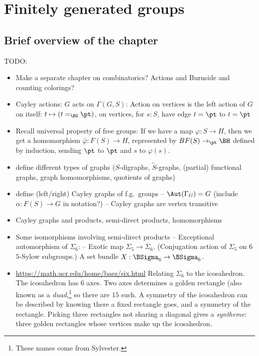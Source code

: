 \chapter{Finitely generated groups}
\label{ch:fggroups}

\section{Brief overview of the chapter}
\label{sec:fggroups-overview}

TODO:
\begin{itemize}
\item Make a separate chapter on combinatorics? Actions and Burnside and counting colorings?
\item Cayley actions: $G$ acts on $\Gamma(G,S)$: Action on vertices is the left action of $G$ on itself: $t \mapsto (t=_{\BG} \pt)$, on vertices, for $s : S$, have edge $t = \pt$ to $t = \pt$
\item Recall universal property of free groups: If we have a map $\varphi : S \to H$, then we get a homomorphism $\bar\varphi : F(S) \to H$, represented by $BF(S) \to_\pt \BH$ defined by induction, sending $\pt$ to $\pt$ and $s$ to $\varphi(s)$.
\item define different types of graphs ($S$-digraphs, $\tilde S$-graphs,
  (partial) functional graphs, graph homomorphisms, quotients of graphs)
\item define (left/right) Cayley graphs of f.g.~groups
  -- $\Aut(\Gamma_G) = G$ (include $\alpha : F(S) \to G$ in notation?)
  -- Cayley graphs are vertex transitive
\item Cayley graphs and products, semi-direct products, homomorphisms
\item Some isomorphisms involving semi-direct products
  -- Exceptional automorphism of $\Sigma_6$:
  -- Exotic map $\Sigma_5 \to \Sigma_6$.
  (Conjugation action of $\Sigma_5$ on $6$ $5$-Sylow subgroups.)
  A set bundle $X : \BSigma_6 \to \BSigma_6$.
\item \url{https://math.ucr.edu/home/baez/six.html}
  Relating $\Sigma_6$ to the icosahedron.
  The icosahedron has $6$ axes. Two axes determines a golden rectangle (also known as a \emph{duad},\footnote{%
    These names come from Sylvester.}
  so there are $15$ such. A symmetry of the icosahedron can be described
  by knowing there a fixed rectangle goes, and a symmetry of the rectangle.
  Picking three rectangles not sharing a diagonal gives a \emph{syntheme}:
  three golden rectangles whose vertices make up the icosahedron.

\end{itemize}
